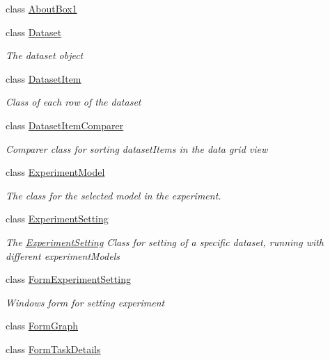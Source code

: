 \begin{DoxyCompactItemize}
\item 
class \hyperlink{class_acrive_crowd_g_u_i_1_1_about_box1}{About\+Box1}
\item 
class \hyperlink{class_acrive_crowd_g_u_i_1_1_dataset}{Dataset}
\begin{DoxyCompactList}\small\item\em The dataset object \end{DoxyCompactList}\item 
class \hyperlink{class_acrive_crowd_g_u_i_1_1_dataset_item}{Dataset\+Item}
\begin{DoxyCompactList}\small\item\em Class of each row of the dataset \end{DoxyCompactList}\item 
class \hyperlink{class_acrive_crowd_g_u_i_1_1_dataset_item_comparer}{Dataset\+Item\+Comparer}
\begin{DoxyCompactList}\small\item\em Comparer class for sorting dataset\+Items in the data grid view \end{DoxyCompactList}\item 
class \hyperlink{class_acrive_crowd_g_u_i_1_1_experiment_model}{Experiment\+Model}
\begin{DoxyCompactList}\small\item\em The class for the selected model in the experiment. \end{DoxyCompactList}\item 
class \hyperlink{class_acrive_crowd_g_u_i_1_1_experiment_setting}{Experiment\+Setting}
\begin{DoxyCompactList}\small\item\em The \hyperlink{class_acrive_crowd_g_u_i_1_1_experiment_setting}{Experiment\+Setting} Class for setting of a specific dataset, running with different experiment\+Models \end{DoxyCompactList}\item 
class \hyperlink{class_acrive_crowd_g_u_i_1_1_form_experiment_setting}{Form\+Experiment\+Setting}
\begin{DoxyCompactList}\small\item\em Windows form for setting experiment \end{DoxyCompactList}\item 
class \hyperlink{class_acrive_crowd_g_u_i_1_1_form_graph}{Form\+Graph}
\item 
class \hyperlink{class_acrive_crowd_g_u_i_1_1_form_task_details}{Form\+Task\+Details}

\end{DoxyCompactItemize}
